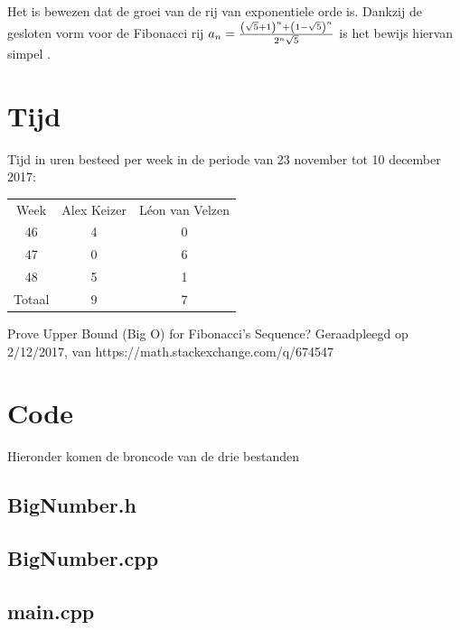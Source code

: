 \documentclass[10pt]{article}
\begin{document}
Het is bewezen dat de groei van de rij van exponentiele orde is. Dankzij de gesloten vorm voor de Fibonacci rij $a_n={{\left(\sqrt{5}+1\right)^{n}+\left(1-\sqrt{5}\right)^{n}}\over{2^{n}\sqrt{5}}}$ is het bewijs hiervan simpel \cite{proof}.

\section{Tijd}

Tijd in uren besteed per week in de periode van 23 november tot 10 december 2017:

\begin{center}
\begin{tabular}{ |c|c|c| }
\hline
Week & Alex Keizer & L\'{e}on van Velzen \\
46 & 4 & 0 \\
47 & 0 & 6 \\
48 & 5 & 1 \\ 
\hline
Totaal & 9 & 7 \\
\hline
\end{tabular}
\end{center}

\begin{thebibliography}{9}
     Prove Upper Bound (Big O) for Fibonacci's Sequence? Geraadpleegd op 2/12/2017, van https://math.stackexchange.com/q/674547
\end{thebibliography}

\section*{Code}
Hieronder komen de broncode van de drie bestanden
\subsection*{BigNumber.h}

\subsection*{BigNumber.cpp}

\subsection*{main.cpp}

\end{document}
